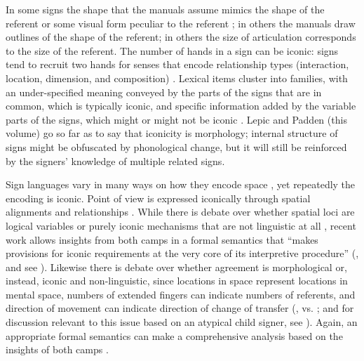 \documentclass[output=paper,
modfonts
]{LSP/langsci}
\begin{document}
In some signs the shape that the manuals assume mimics the shape of the
referent or some visual form peculiar to the referent \citep{pizzuto1995,pietrandrea2007}; in others the manuals draw outlines
of the shape of the referent; in others the size of articulation
corresponds to the size of the referent. The number of hands in a sign
can be iconic: signs tend to recruit two hands for senses that encode
relationship types (interaction, location, dimension, and composition)
\citep{lepic2016}. Lexical items cluster into families, with an
under-specified meaning conveyed by the parts of the signs that are in
common, which is typically iconic, and specific information added by the
variable parts of the signs, which might or might not be iconic
\citep{fernald2000}. Lepic and Padden (this volume) go so far as
to say that iconicity is morphology; internal structure of signs might
be obfuscated by phonological change, but it will still be reinforced by
the signers' knowledge of multiple related signs.

Sign languages vary in many ways on how they encode space \citep{perniss2015}, yet repeatedly the encoding is iconic. Point of view
is expressed iconically through spatial alignments and relationships
\citep{pyers2015}. While there is debate over whether
spatial loci are logical variables \citep{lillo1990,neidle2000} or purely iconic mechanisms that are not linguistic at all
\citep{cuxac1999,liddell2003}, recent work allows insights from both camps
in a formal semantics that ``makes provisions for iconic requirements at
the very core of its interpretive procedure'' (\citealt[91]{schlenker2013}, and see \citealt{giorgolo2010}). Likewise there is debate over
whether agreement is morphological or, instead, iconic and
non-linguistic, since locations in space represent locations in mental
space, numbers of extended fingers can indicate numbers of referents,
and direction of movement can indicate direction of change of transfer
(\citealt{meier1987,janis1995,mathur2000}, vs. \citealt{liddell1995,liddell2003}; and for
discussion relevant to this issue based on an atypical child signer, see
\citealt{quinto2013}). Again, an appropriate formal semantics can
make a comprehensive analysis based on the insights of both camps
\citep{schlenker2016n}.
\end{document}
